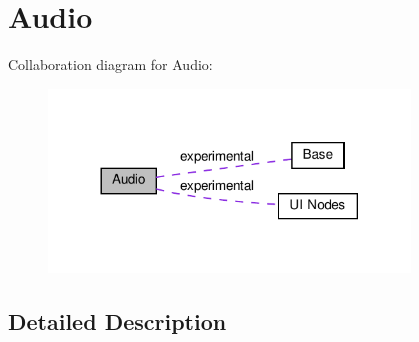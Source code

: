 \hypertarget{group__audio}{}\section{Audio}
\label{group__audio}
Collaboration diagram for Audio\+:
\nopagebreak
\begin{figure}[H]
\begin{center}
\leavevmode
\includegraphics[width=272pt]{group__audio}
\end{center}
\end{figure}


\subsection{Detailed Description}
